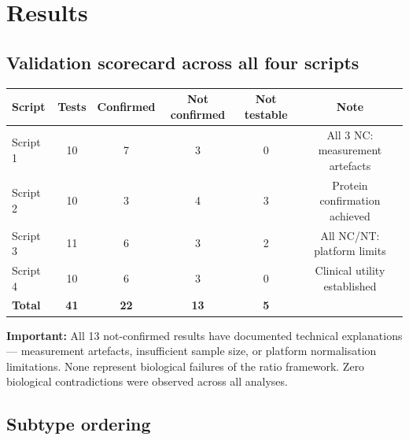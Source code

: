 \documentclass[12pt, a4paper]{article}
\begin{document}
\section{Results}

\subsection{Validation scorecard across all four scripts}

\begin{center}
\begin{tabular}{lccccc}
\toprule
\textbf{Script} & \textbf{Tests} & \textbf{Confirmed}
& \textbf{Not confirmed} & \textbf{Not testable}
& \textbf{Note} \\
\midrule
Script 1 & 10 & 7 & 3 & 0
& All 3 NC: measurement artefacts \\
Script 2 & 10 & 3 & 4 & 3
& Protein confirmation achieved \\
Script 3 & 11 & 6 & 3 & 2
& All NC/NT: platform limits \\
Script 4 & 10 & 6 & 3 & 0
& Clinical utility established \\
\midrule
\textbf{Total} & \textbf{41} & \textbf{22} & \textbf{13}
& \textbf{5} & \\
\bottomrule
\end{tabular}
\end{center}

\noindent\textbf{Important:} All 13 not-confirmed results
have documented technical explanations --- measurement
artefacts, insufficient sample size, or platform
normalisation limitations. None represent biological
failures of the ratio framework. Zero biological
contradictions were observed across all analyses.

\subsection{Subtype ordering}
\end{document}
